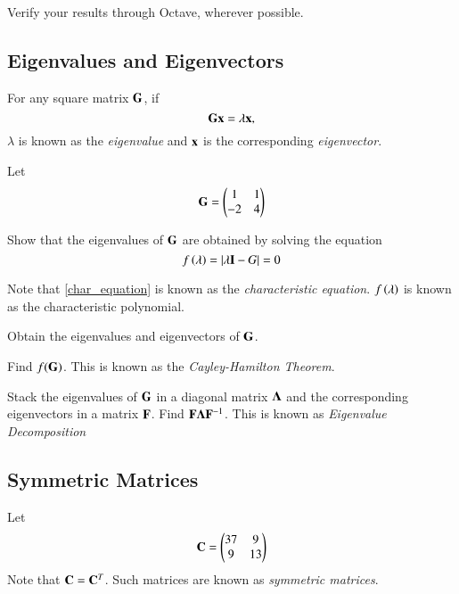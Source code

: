 Verify your results through Octave, wherever possible.

\subsection{Eigenvalues and Eigenvectors}
For any square matrix $\mathbf{G}$, if
%
\begin{equation}
\mathbf{G}\mathbf{x} = \lambda \mathbf{x},
\end{equation}
%
$\lambda$ is known as the {\em eigenvalue} and $\mathbf{x}$ is the corresponding {\em eigenvector}.

Let
%
\begin{equation}
\mathbf{G} = \begin{pmatrix}
1 & 1\\-2 & 4
\end{pmatrix}
\end{equation}
\begin{problem}
Show that the eigenvalues of $\mathbf{G}$ are obtained by solving the equation
%
\begin{equation}
\label{char_equation}
f\left(\lambda\right)=\left\vert\lambda \mathbf{I}- G\right\vert = 0
\end{equation}
%
\end{problem}
Note that \eqref{char_equation} is known as the {\em characteristic equation}.  $f\left(\lambda\right)$ is known as the characteristic polynomial.

\begin{problem}
	Obtain the eigenvalues and eigenvectors of $\mathbf{G}$.
\end{problem}
\begin{problem}
	Find $f(\mathbf{G})$.  This is known as the {\em Cayley-Hamilton Theorem}.
\end{problem}


\begin{problem}
	Stack the eigenvalues of $\mathbf{G}$ in a diagonal matrix $\mathbf{\Lambda}$ and the corresponding eigenvectors in a matrix $\mathbf{F}$.  Find $\mathbf{F}\mathbf{\Lambda}\mathbf{F}^{-1}$.  This is known as {\em Eigenvalue Decomposition}
\end{problem}
%

\subsection{Symmetric Matrices}
Let 
%
\begin{equation}
\mathbf{C} = \begin{pmatrix}
37 & 9 \\9 & 13
\end{pmatrix}
\end{equation}
%
Note that $\mathbf{C} = \mathbf{C}^T$.  Such matrices are known as {\em symmetric matrices}.

